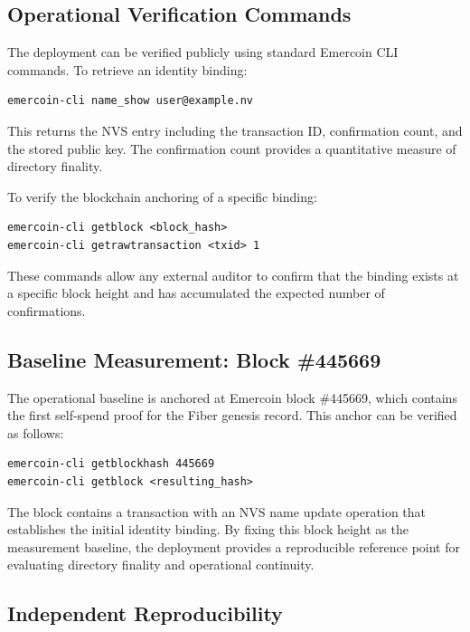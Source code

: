 \documentclass[11pt,a4paper]{article}
\begin{document}
\subsection{Operational Verification Commands}

The deployment can be verified publicly using standard Emercoin CLI commands. To retrieve an identity binding:

\begin{verbatim}
emercoin-cli name_show user@example.nv
\end{verbatim}

This returns the NVS entry including the transaction ID, confirmation count, and the stored public key. The confirmation count provides a quantitative measure of directory finality.

To verify the blockchain anchoring of a specific binding:

\begin{verbatim}
emercoin-cli getblock <block_hash>
emercoin-cli getrawtransaction <txid> 1
\end{verbatim}

These commands allow any external auditor to confirm that the binding exists at a specific block height and has accumulated the expected number of confirmations.

\subsection{Baseline Measurement: Block \#445669}

The operational baseline is anchored at Emercoin block \#445669, which contains the first self-spend proof for the Fiber genesis record. This anchor can be verified as follows:

\begin{verbatim}
emercoin-cli getblockhash 445669
emercoin-cli getblock <resulting_hash>
\end{verbatim}

The block contains a transaction with an NVS name update operation that establishes the initial identity binding. By fixing this block height as the measurement baseline, the deployment provides a reproducible reference point for evaluating directory finality and operational continuity.

\subsection{Independent Reproducibility}
\end{document}

